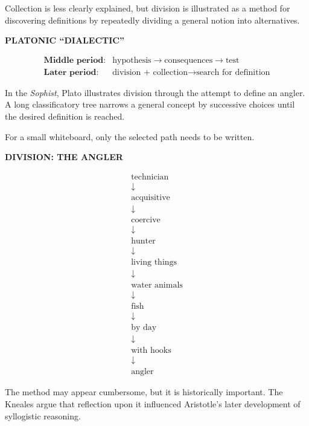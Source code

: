 \documentclass[11pt]{article}
\begin{document}
Collection is less clearly explained, but division is illustrated
as a method for discovering definitions by repeatedly dividing a
general notion into alternatives.

\begin{whiteboard}
\textbf{PLATONIC ``DIALECTIC''}

\[
\begin{array}{ll}
\textbf{Middle period:}
&
\text{hypothesis}
\rightarrow
\text{consequences}
\rightarrow
\text{test}
\\[0.7em]
\textbf{Later period:}
&
\text{division + collection}
\rightarrow
\text{search for definition}
\end{array}
\]
\end{whiteboard}

In the \textit{Sophist}, Plato illustrates division through the
attempt to define an angler. A long classificatory tree narrows a
general concept by successive choices until the desired definition
is reached.

For a small whiteboard, only the selected path needs to be
written.

\begin{whiteboard}
\textbf{DIVISION: THE ANGLER}

\[
\begin{array}{c}
\text{technician}\\
\downarrow\\
\text{acquisitive}\\
\downarrow\\
\text{coercive}\\
\downarrow\\
\text{hunter}\\
\downarrow\\
\text{living things}\\
\downarrow\\
\text{water animals}\\
\downarrow\\
\text{fish}\\
\downarrow\\
\text{by day}\\
\downarrow\\
\text{with hooks}\\
\downarrow\\
\boxed{\text{angler}}
\end{array}
\]
\end{whiteboard}

The method may appear cumbersome, but it is historically
important. The Kneales argue that reflection upon it influenced
Aristotle's later development of syllogistic reasoning.
\end{document}

